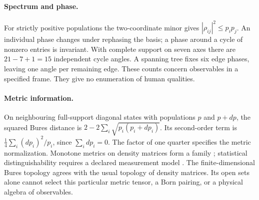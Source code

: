 \paragraph{Spectrum and phase.}
For strictly positive populations the two-coordinate minor gives $|\rho_{ij}|^2\le p_i p_j$. An individual phase changes under rephasing the basis; a phase around a cycle of nonzero entries is invariant. With complete support on seven axes there are $21-7+1=15$ independent cycle angles. A spanning tree fixes six edge phases, leaving one angle per remaining edge. These counts concern observables in a specified frame. They give no enumeration of human qualities.

\paragraph{Metric information.}
On neighbouring full-support diagonal states with populations $p$ and $p+dp$, the squared Bures distance is $2-2\sum_i\sqrt{p_i(p_i+dp_i)}$. Its second-order term is $\tfrac14\sum_i(dp_i)^2/p_i$, since $\sum_i dp_i=0$. The factor of one quarter specifies the metric normalization. Monotone metrics on density matrices form a family \citep{petz1996}; statistical distinguishability requires a declared measurement model \citep{braunstein1994}. The finite-dimensional Bures topology agrees with the usual topology of density matrices. Its open sets alone cannot select this particular metric tensor, a Born pairing, or a physical algebra of observables.
